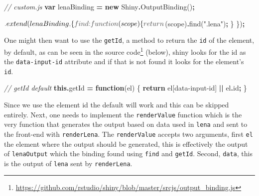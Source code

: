 \documentclass[
]{krantz}
\makeatletter
\newenvironment{Shaded}{\begin{snugshade}}{\end{snugshade}}
\newcommand{\AttributeTok}[1]{\textcolor[rgb]{0.61,0.61,0.61}{#1}}
\newcommand{\CommentTok}[1]{\textcolor[rgb]{0.37,0.37,0.37}{\textit{#1}}}
\newcommand{\ControlFlowTok}[1]{\textcolor[rgb]{0.27,0.27,0.27}{\textbf{#1}}}
\newcommand{\DataTypeTok}[1]{\textcolor[rgb]{0.27,0.27,0.27}{#1}}
\newcommand{\FunctionTok}[1]{\textcolor[rgb]{0,0,0}{#1}}
\newcommand{\KeywordTok}[1]{\textcolor[rgb]{0.27,0.27,0.27}{\textbf{#1}}}
\newcommand{\NormalTok}[1]{#1}
\newcommand{\OperatorTok}[1]{\textcolor[rgb]{0.43,0.43,0.43}{\textbf{#1}}}
\newcommand{\StringTok}[1]{\textcolor[rgb]{0.5,0.5,0.5}{#1}}
\renewcommand{\href}[2]{#2\footnote{\url{#1}}}
\newenvironment{kframe}{%
\medskip{}
\setlength{\fboxsep}{.8em}
 \def\at@end@of@kframe{}%
 \ifinner\ifhmode%
  \def\at@end@of@kframe{\end{minipage}}%
  \begin{minipage}{\columnwidth}%
 \fi\fi%
 \def\FrameCommand##1{\hskip\@totalleftmargin \hskip-\fboxsep
 \colorbox{shadecolor}{##1}\hskip-\fboxsep
     \hskip-\linewidth \hskip-\@totalleftmargin \hskip\columnwidth}%
 \MakeFramed {\advance\hsize-\width
   \@totalleftmargin\z@ \linewidth\hsize
   \@setminipage}}%
 {\par\unskip\endMakeFramed%
 \at@end@of@kframe}
\renewenvironment{Shaded}{\begin{kframe}}{\end{kframe}}
\makeatother
\begin{document}
\begin{Shaded}
\begin{Highlighting}[]
\CommentTok{// custom.js}
\KeywordTok{var}\NormalTok{ lenaBinding }\OperatorTok{=} \KeywordTok{new}\NormalTok{ Shiny}\OperatorTok{.}\FunctionTok{OutputBinding}\NormalTok{()}\OperatorTok{;}

\NormalTok{$}\OperatorTok{.}\FunctionTok{extend}\NormalTok{(lenaBinding}\OperatorTok{,}\NormalTok{ \{}
  \DataTypeTok{find}\OperatorTok{:} \KeywordTok{function}\NormalTok{(scope) \{}
    \ControlFlowTok{return}\NormalTok{ $(scope)}\OperatorTok{.}\FunctionTok{find}\NormalTok{(}\StringTok{".lena"}\NormalTok{)}\OperatorTok{;}
\NormalTok{  \}}
\NormalTok{\})}\OperatorTok{;}
\end{Highlighting}
\end{Shaded}

One might then want to use the \texttt{getId}, a method to return the \texttt{id} of the element, by default, as can be seen in the \href{https://github.com/rstudio/shiny/blob/master/srcjs/output_binding.js}{source code} (below), shiny looks for the id as the \texttt{data-input-id} attribute and if that is not found it looks for the element's \texttt{id}.

\begin{Shaded}
\begin{Highlighting}[]
\CommentTok{// getId default}
\KeywordTok{this}\OperatorTok{.}\AttributeTok{getId} \OperatorTok{=} \KeywordTok{function}\NormalTok{(el) \{}
  \ControlFlowTok{return}\NormalTok{ el[}\StringTok{\textquotesingle{}data{-}input{-}id\textquotesingle{}}\NormalTok{] }\OperatorTok{||}\NormalTok{ el}\OperatorTok{.}\AttributeTok{id}\OperatorTok{;}
\NormalTok{\}}
\end{Highlighting}
\end{Shaded}

Since we use the element id the default will work and this can be skipped entirely. Next, one needs to implement the \texttt{renderValue} function which is the very function that generates the output based on data used in \texttt{lena} and sent to the front-end with \texttt{renderLena}. The \texttt{renderValue} accepts two arguments, first \texttt{el} the element where the output should be generated, this is effectively the output of \texttt{lenaOutput} which the binding found using \texttt{find} and \texttt{getId}. Second, \texttt{data}, this is the output of \texttt{lena} sent by \texttt{renderLena}.
\end{document}

